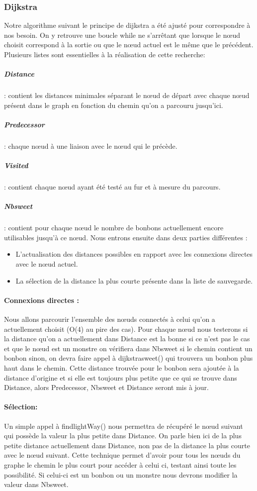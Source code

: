 \documentclass[12pt, oneside]{article}
\begin{document}
\subsubsection{Dijkstra}
Notre algorithme suivant le principe de dijkstra a été ajusté pour correspondre à nos besoin. On y retrouve une boucle while ne s’arrêtant que lorsque le nœud choisit correspond à la sortie ou que le nœud actuel est le même que le précédent. 
Plusieurs listes sont essentielles à la réalisation de cette recherche:
\subparagraph{Distance} : contient les distances minimales séparant le nœud de départ avec chaque nœud présent dans le graph en fonction du chemin qu’on a parcouru jusqu’ici.
\subparagraph{Predecessor} : chaque nœud à une liaison avec le nœud qui le précède.
\subparagraph{Visited} : contient chaque nœud ayant été testé au fur et à mesure du parcours.
\subparagraph{Nb\textunderscore sweet} : contient pour chaque nœud le nombre de bonbons actuellement encore utilisables jusqu’à ce nœud.
\newpage
Nous entrons ensuite dans deux parties différentes : 
\begin{itemize}
\item 
L’actualisation des distances possibles en rapport avec les connexions directes avec le nœud actuel.
\item
La sélection de la distance la plus courte présente dans la liste de sauvegarde.
\end{itemize}

\paragraph{Connexions directes :}
Nous allons parcourir l’ensemble des nœuds connectés à celui qu’on a actuellement choisit (O(4) au pire des cas). Pour chaque nœud nous testerons si la distance qu’on a actuellement dans Distance est la bonne si ce n’est pas le cas et que le nœud est un monstre on vérifiera dans Nb\textunderscore sweet si le chemin contient un bonbon sinon, on devra faire appel à dijkstra\textunderscore sweet() qui trouvera un bonbon plus haut dans le chemin. Cette distance trouvée pour le bonbon sera ajoutée à la distance d’origine et si elle est toujours plus petite que ce qui se trouve dans Distance, alors Predecessor, Nb\textunderscore sweet et Distance seront mis à jour.

\paragraph{Sélection:}
Un simple appel à find\textunderscore lightWay() nous permettra de récupéré le nœud suivant qui possède la valeur la plus petite dans Distance. On parle bien ici de la plus petite distance actuellement dans Distance, non pas de la distance la plus courte avec le nœud suivant.
Cette technique permet d’avoir pour tous les nœuds du graphe le chemin le plus court pour accéder à celui ci, testant ainsi toute les possibilité. Si celui-ci est un bonbon ou un monstre nous devrons modifier la valeur dans Nb\textunderscore sweet.
\end{document}
